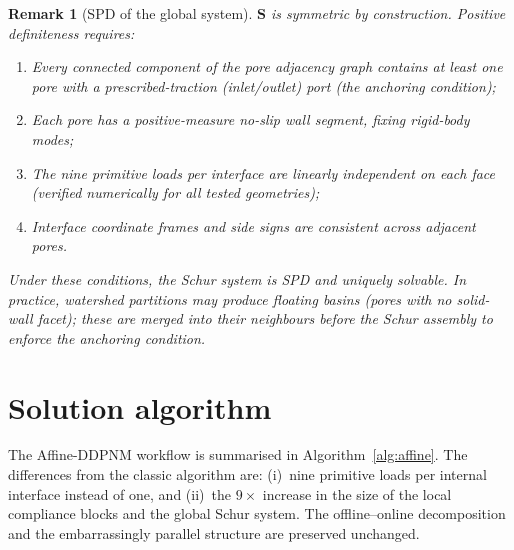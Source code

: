 \documentclass[11pt,a4paper]{article}
\newtheorem{remark}{Remark}
\newcommand{\Schur}{\mathbf{S}}
\begin{document}
\begin{remark}[SPD of the global system]\label{rem:spd}
  $\Schur$ is symmetric by construction.  Positive definiteness requires:
  \begin{enumerate}[nosep,leftmargin=*]
    \item Every connected component of the pore adjacency graph contains
      at least one pore with a prescribed-traction (inlet/outlet) port
      (the \emph{anchoring condition});
    \item Each pore has a positive-measure no-slip wall segment, fixing
      rigid-body modes;
    \item The nine primitive loads per interface are linearly independent
      on each face (verified numerically for all tested geometries);
    \item Interface coordinate frames and side signs are consistent across
      adjacent pores.
  \end{enumerate}
  Under these conditions, the Schur system is SPD and uniquely solvable.
  In practice, watershed partitions may produce \emph{floating basins}
  (pores with no solid-wall facet); these are merged into their
  neighbours before the Schur assembly to enforce the anchoring condition.
\end{remark}

\section{Solution algorithm}
\label{sec:algorithm}

The Affine-DDPNM workflow is summarised in Algorithm~\ref{alg:affine}.
The differences from the classic algorithm are: (i)~nine primitive loads
per internal interface instead of one, and (ii)~the $9\times$ increase
in the size of the local compliance blocks and the global Schur system.
The offline--online decomposition and the embarrassingly parallel
structure are preserved unchanged.
\end{document}
